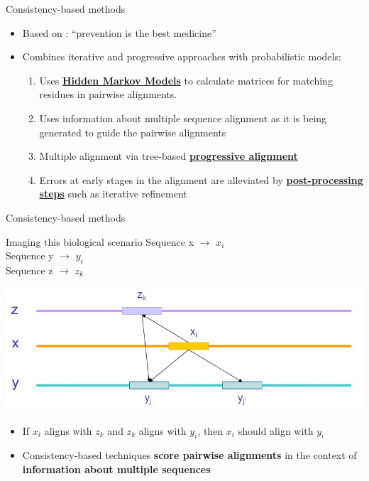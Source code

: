 \begin{frame}{Consistency-based methods}

    \begin{itemize}    
        \item Based on : “prevention is the best medicine”
        \item Combines iterative and progressive approaches with probabilistic models:
        \begin{enumerate}
        \renewcommand{\baselinestretch}{2}
        \item Uses \textbf{\underline{Hidden Markov Models}} to calculate matrices for matching residues in pairwise alignments. 
        \item Uses information about multiple sequence alignment as it is being generated to guide the pairwise alignments
        \item Multiple alignment via tree-based \textbf{\underline{progressive alignment}}
        \item Errors at early stages in the alignment are alleviated by \textbf{\underline{post-processing steps}} such as iterative refinement
        \end{enumerate}

    \end{itemize}
    
\end{frame}

\begin{frame}{Consistency-based methods}

    \begin{block}{Imaging this biological scenario}
    \centering
            \large Sequence x $\rightarrow$ $ x_{i}$ \\
            \large Sequence y $\rightarrow$ $ y_{i}$ \\
            \large Sequence z $\rightarrow$ $ z_{k}$ \\
    \end{block}
    \centering
    \includegraphics[width=0.65\linewidth]{img/xyz.PNG}
    \begin{itemize}
        \item If $ x_{i}$ aligns with $ z_{k}$ and $ z_{k}$ aligns with $ y_{i}$, then $x_{i}$ should align with $ y_{i}$
    \end{itemize}
    \begin{itemize}
            \item Consistency-based techniques \textbf{score pairwise alignments} in the context of \textbf{information about multiple sequences}
    \end{itemize}
\end{frame}